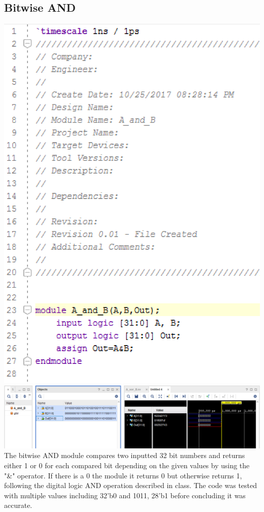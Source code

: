\documentclass{article}
\begin{document}
\subsection{Bitwise AND}
\includegraphics[scale=0.5]{photos/and_code}
\break
\includegraphics[scale=0.4]{photos/and_simulation}
\break
The bitwise AND module compares two inputted 32 bit numbers and returns either 1 or 0 for each compared bit depending on the given values by using the "\&" operator. If there is a 0 the module it returns 0 but otherwise returns 1, following the digital logic AND operation described in class. The code was tested with multiple values including {32'b0} and {1011, 28'b1} before concluding it was accurate.
\end{document}
